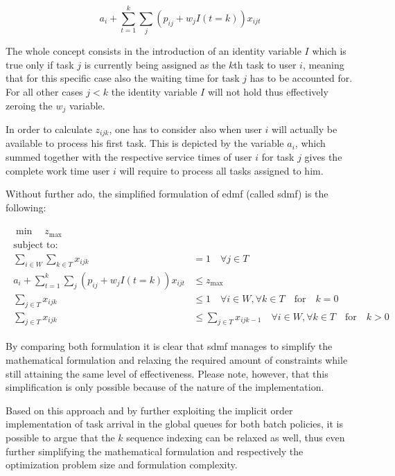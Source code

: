 \begin{equation}
\label{eq:simplified_z_with_k}
	a_i + \sum_{t=1}^k \sum_j (p_{ij} + w_j I(t=k))x_{ijt}
\end{equation}

The whole concept consists in the introduction of an identity variable $I$ which is true only if task $j$ is currently being assigned as the $k$th task to user $i$, meaning that for this specific case also the waiting time for task $j$ has to be accounted for. For all other cases \ie $j<k$ the identity variable $I$ will not hold thus effectively zeroing the $w_j$ variable.

In order to calculate $z_{ijk}$, one has to consider also when user $i$ will actually be available to process his first task. This is depicted by the variable $a_i$, which summed together with the respective service times of user $i$ for task $j$ gives the complete work time user $i$ will require to process all tasks assigned to him.

Without further ado, the simplified formulation of \gls{edmf} (called \gls{sdmf}) is the following:

\begin{align}
	\begin{split}
	    \min \quad z_{\text{max}}\\
	    \text{subject to:} \\
	    \sum_{i \in W} \sum_{k \in T} x_{ijk} &= 1 \quad \forall j \in T\\
	    a_i + \sum_{t=1}^k \sum_j (p_{ij} + w_j I(t=k))x_{ijt} &\leq z_{\text{max}}\\
	    \sum_{j \in T} x_{ijk} &\leq 1 \quad \forall i \in W, \forall k \in T \quad \text{for} \quad k=0\\
	    \sum_{j \in T} x_{ijk} &\leq \sum_{j \in T} x_{ijk-1} \quad \forall i \in W, \forall k \in T \quad \text{for} \quad k>0
	\end{split}
\end{align}

By comparing both formulation it is clear that \gls{sdmf} manages to simplify the mathematical formulation and relaxing the required amount of constraints while still attaining the same level of effectiveness. Please note, however, that this simplification is only possible because of the nature of the implementation.

Based on this approach and by further exploiting the implicit order implementation of task arrival in the global queues for both batch policies, it is possible to argue that the $k$ sequence indexing can be relaxed as well, thus even further simplifying the mathematical formulation and respectively the optimization problem size and formulation complexity.

